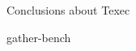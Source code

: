 \documentclass[aspectratio=43,t]{beamer}
\begin{document}
  \begin{frame}[fragile]{Conclusions about Texec}
  \end{frame}

  \begin{frame}[fragile]{gather-bench}
  \end{frame}




  { %

  }
\end{document}
